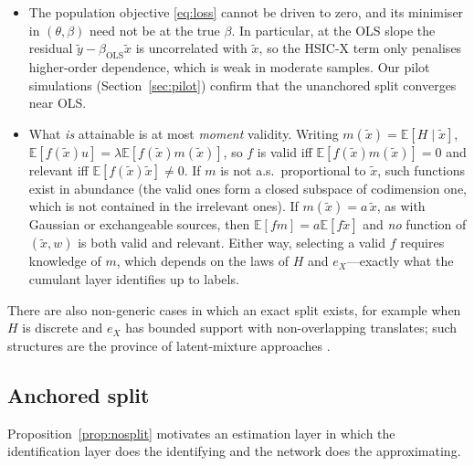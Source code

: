 \documentclass[11pt]{article}
\theoremstyle{definition}
\theoremstyle{remark}
\newcommand{\E}{\mathbb{E}}
\newcommand{\tx}{\tilde{x}}
\newcommand{\ty}{\tilde{y}}
\begin{document}
\begin{itemize}
  \item The population objective \eqref{eq:loss} cannot be driven to zero, and its minimiser in
  $(\theta,\beta)$ need not be at the true $\beta$. In particular, at the OLS slope the residual
  $\ty - \beta_{\mathrm{OLS}}\tx$ is uncorrelated with $\tx$, so the HSIC-X term only penalises
  higher-order dependence, which is weak in moderate samples. Our pilot simulations
  (Section~\ref{sec:pilot}) confirm that the unanchored split converges near OLS.
  \item What \emph{is} attainable is at most \emph{moment} validity. Writing $m(\tx)=\E[H\mid\tx]$,
  $\E[f(\tx)u] = \lambda\E[f(\tx)m(\tx)]$, so $f$ is valid iff $\E[f(\tx)m(\tx)]=0$ and relevant iff
  $\E[f(\tx)\tx]\ne0$. If $m$ is not a.s.\ proportional to $\tx$, such functions exist in abundance
  (the valid ones form a closed subspace of codimension one, which is not contained in the
  irrelevant ones). If $m(\tx)=a\,\tx$, as with Gaussian or exchangeable sources, then
  $\E[fm]=a\E[f\tx]$ and \emph{no} function of $(\tx,w)$ is both valid and relevant. Either way,
  selecting a valid $f$ requires knowledge of $m$, which depends on the laws of $H$ and
  $e_X$---exactly what the cumulant layer identifies up to labels.
\end{itemize}

There are also non-generic cases in which an exact split exists, for example when $H$ is discrete
and $e_X$ has bounded support with non-overlapping translates; such structures are the province of
latent-mixture approaches \citep{ebbes2005}.

\subsection{Anchored split}\label{sec:anchored}

Proposition~\ref{prop:nosplit} motivates an estimation layer in which the identification layer does
the identifying and the network does the approximating.
\end{document}
